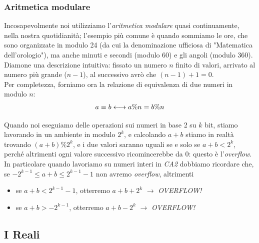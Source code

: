 \subsubsection{Aritmetica modulare} Incosapevolmente noi utilizziamo l'\textit{aritmetica modulare} quasi continuamente, nella nostra quotidianità; l'esempio più comune è quando sommiamo le ore, che sono organizzate in modulo 24 (da cui la denominazione ufficiosa di "Matematica dell'orologio"), ma anche minuti e secondi (modulo 60) e gli angoli (modulo 360).\\
Diamone una descrizione intuitiva: fissato un numero $n$ finito di valori, arrivato al numero più grande ($n-1$), al successivo avrò che $(n-1)+1=0$.\\
Per completezza, forniamo ora la relazione di equivalenza di due numeri in modulo $n$:\\
\begin{equation*}
\centering
a\equiv b \longleftrightarrow a\%n=b\%n
\end{equation*}

Quando noi eseguiamo delle operazioni sui numeri in base 2 su $k$ bit, stiamo lavorando in un ambiente in modulo $2^{k}$, e calcolando $a+b$ stiamo in realtà trovando $(a+b)\%2^{k}$, e i due valori saranno uguali se e solo se $a+b<2^{k}$, perché altrimenti ogni valore successivo ricomincerebbe da 0: questo è l'\textit{overflow}.\\
In particolare quando lavoriamo su numeri interi in \textit{CA2} dobbiamo ricordare che, se $-2^{k-1}\le a+b\le 2^{k-1}-1$ non avremo \textit{overflow}, altrimenti
\begin{itemize}[noitemsep,nolistsep]
	\item se $a+b<2^{k-1}-1$, otterremo $a+b+2^{k}$ $\longrightarrow$ \textit{OVERFLOW!}
	\item se $a+b>-2^{k-1}$, otterremo $a+b-2^{k}$ $\longrightarrow$ \textit{OVERFLOW!}
\end{itemize}

\subsection{I Reali}


